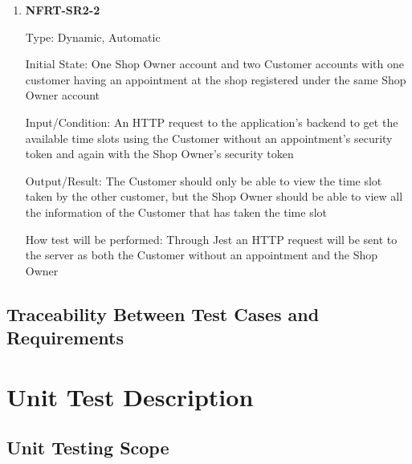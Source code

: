 \documentclass[12pt, titlepage]{article}
\begin{document}
\begin{enumerate}
	\item \textbf{NFRT-SR2-2}

	      Type: Dynamic, Automatic

	      Initial State: One Shop Owner account and two Customer accounts with one customer having an
	      appointment at the shop registered under the same Shop Owner account

	      Input/Condition: An HTTP request to the application's backend to get the available time slots using
	      the Customer without an appointment's security token and again with the Shop Owner's security token

	      Output/Result: The Customer should only be able to view the time slot taken by the other customer,
	      but the Shop Owner should be able to view all the information of the Customer that has taken the
	      time slot

	      How test will be performed: Through Jest an HTTP request will be sent to the server as both the
	      Customer without an appointment and the Shop Owner

\end{enumerate}

\subsection{Traceability Between Test Cases and Requirements}


\section{Unit Test Description} \label{Unit Test Description}


\subsection{Unit Testing Scope}

\end{document}
